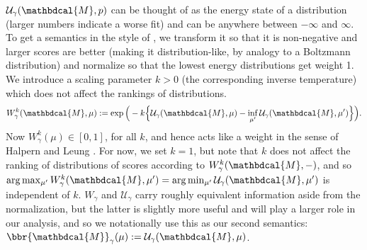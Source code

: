 \documentclass[letterpaper]{article} %
\theoremstyle{plain}
\theoremstyle{definition}
\theoremstyle{remark}
\newcommand{\dg}[1]{\mathbdcal{#1}}
\begin{document}
{$\mathcal U_\gamma(\dg M, p)$ can be thought of as the energy state of
        a distribution (larger numbers indicate a worse fit) and can
        be anywhere between $-\infty$ and $\infty$.
        To get a semantics in the style of \cite{halpern2015weighted},
        we transform it so that it is non-negative and larger scores
        are better (making it distribution-like, by analogy to a
        Boltzmann distribution) and normalize so that the lowest
        energy distributions get weight 1. We introduce a scaling
        parameter $k > 0$ (the corresponding inverse temperature)
       which does not affect the rankings of distributions. 
       \[ W^k_\gamma(\dg M, \mu) := \exp\Big(  -k \Big\{\mathcal U_{\gamma}(\dg M,\mu)- \inf_{\mu'} \mathcal U_\gamma(\dg M,\mu')\Big\} \Big).\]
Now 
$W^k_\gamma(\mu) \in  [0,1]$, for all $k$, and hence acts like a weight in the sense of  Halpern and Leung \citeyear{halpern2015weighted}.
For now, we set $k=1$, but note that $k$ does not affect the ranking of distributions of scores according to $W^k_\gamma(\dg M, -)$, and so $\arg\max_{\mu'} W^k_\gamma(\dg M, \mu')  = \arg\min_{\mu'} \mathcal U_\gamma(\dg M,\mu')$ is independent of $k$. 
%
$W_\gamma$ and $\mathcal U_\gamma$ carry roughly equivalent information aside from the normalization, but the latter is slightly more useful and will play a larger role in our analysis, and so we notationally use this as our second semantics: $\bbr{\dg M}_\gamma(\mu) := \mathcal U_\gamma(\dg M, \mu)$.
}
\end{document}
